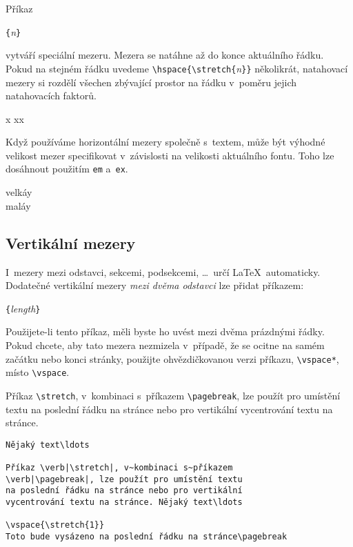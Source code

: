 \label{cmd:stretch} 
Příkaz
\begin{lscommand}
\verb|{|\emph{n}\verb|}|
\end{lscommand} 
\noindent vytváří speciální  mezeru. Mezera se natáhne až
do konce aktuálního řádku. Pokud na stejném řádku uvedeme 
\verb|\hspace{\stretch{|\emph{n}\verb|}}| několikrát, natahovací mezery si rozdělí
všechen zbývající prostor na řádku v~poměru jejich natahovacích faktorů.


\begin{example}
x
xx
\end{example}

Když používáme horizontální mezery společně s~textem, může být výhodné
velikost mezer specifikovat v~závislosti na velikosti aktuálního fontu.
Toho lze dosáhnout použitím  \texttt{em}
a~\texttt{ex}.

\begin{example}
{\Large{}velká\hspace{1em}y}\\
{\tiny{}malá\hspace{1em}y}
\end{example}
 
\subsection{Vertikální mezery}
I~mezery mezi odstavci, sekcemi, podsekcemi, \ldots\ určí \LaTeX\ automaticky.
Dodatečné vertikální mezery \emph{mezi dvěma odstavci} lze přidat
příkazem:
\begin{lscommand}
\verb|{|\emph{length}\verb|}|
\end{lscommand}

Použijete-li tento příkaz, měli byste ho uvést mezi dvěma prázdnými řádky.
Pokud chcete, aby tato mezera nezmizela v~případě, že se ocitne na samém
začátku nebo konci stránky, použijte ohvězdičkovanou verzi příkazu,
\verb|\vspace*|, místo \verb|\vspace|.

Příkaz \verb|\stretch|, v~kombinaci s~příkazem
\verb|\pagebreak|, lze použít pro umístění textu
na poslední řádku na stránce nebo pro vertikální
vycentrování textu na stránce.
\begin{code}
\begin{verbatim}
Nějaký text\ldots

Příkaz \verb|\stretch|, v~kombinaci s~příkazem
\verb|\pagebreak|, lze použít pro umístění textu
na poslední řádku na stránce nebo pro vertikální
vycentrování textu na stránce. Nějaký text\ldots

\vspace{\stretch{1}}
Toto bude vysázeno na poslední řádku na stránce\pagebreak
\end{verbatim}
\end{code}

